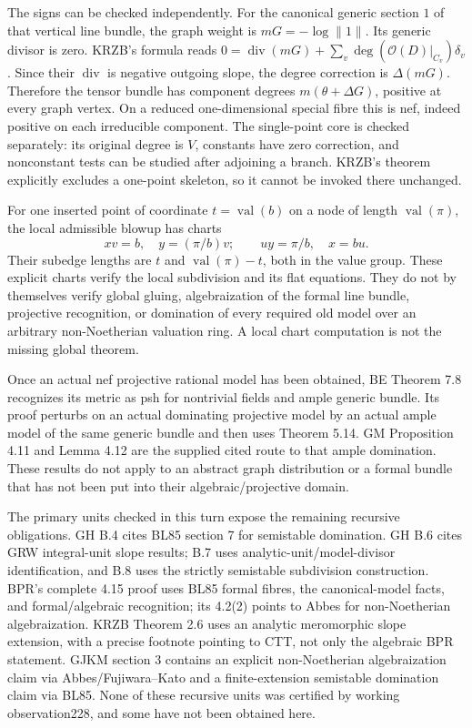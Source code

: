 \documentclass[
  11pt,
]{article}
\begin{document}
The signs can be checked independently. For the canonical generic
section \(1\) of that vertical line bundle, the graph weight is
\(mG=-\log\|1\|\). Its generic divisor is zero. KRZB's formula reads
\(0=\operatorname{div}(mG)+\sum_v\deg(\mathcal O(D)|_{C_v})\delta_v\).
Since their \(\operatorname{div}\) is negative outgoing slope, the
degree correction is \(\Delta(mG)\). Therefore the tensor bundle has
component degrees \(m(\theta+\Delta G)\), positive at every graph
vertex. On a reduced one-dimensional special fibre this is nef, indeed
positive on each irreducible component. The single-point core is checked
separately: its original degree is \(V\), constants have zero
correction, and nonconstant tests can be studied after adjoining a
branch. KRZB's theorem explicitly excludes a one-point skeleton, so it
cannot be invoked there unchanged.

For one inserted point of coordinate \(t=\operatorname{val}(b)\) on a
node of length \(\operatorname{val}(\pi)\), the local admissible blowup
has charts \[
 xv=b,\quad y=(\pi/b)v;\qquad uy=\pi/b,\quad x=bu.
\] Their subedge lengths are \(t\) and \(\operatorname{val}(\pi)-t\),
both in the value group. These explicit charts verify the local
subdivision and its flat equations. They do not by themselves verify
global gluing, algebraization of the formal line bundle, projective
recognition, or domination of every required old model over an arbitrary
non-Noetherian valuation ring. A local chart computation is not the
missing global theorem.

Once an actual nef projective rational model has been obtained, BE
Theorem 7.8 recognizes its metric as psh for nontrivial fields and ample
generic bundle. Its proof perturbs on an actual dominating projective
model by an actual ample model of the same generic bundle and then uses
Theorem 5.14. GM Proposition 4.11 and Lemma 4.12 are the supplied cited
route to that ample domination. These results do not apply to an
abstract graph distribution or a formal bundle that has not been put
into their algebraic/projective domain.

The primary units checked in this turn expose the remaining recursive
obligations. GH B.4 cites BL85 section 7 for semistable domination. GH
B.6 cites GRW integral-unit slope results; B.7 uses
analytic-unit/model-divisor identification, and B.8 uses the strictly
semistable subdivision construction. BPR's complete 4.15 proof uses BL85
formal fibres, the canonical-model facts, and formal/algebraic
recognition; its 4.2(2) points to Abbes for non-Noetherian
algebraization. KRZB Theorem 2.6 uses an analytic meromorphic slope
extension, with a precise footnote pointing to CTT, not only the
algebraic BPR statement. GJKM section 3 contains an explicit
non-Noetherian algebraization claim via Abbes/Fujiwara--Kato and a
finite-extension semistable domination claim via BL85. None of these
recursive units was certified by working observation228, and some have
not been obtained here.
\end{document}
